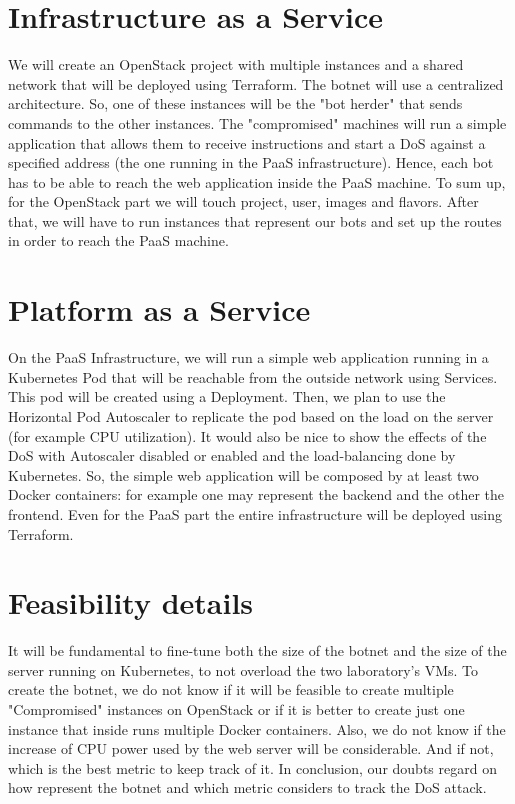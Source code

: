 \documentclass{article}
\begin{document}
\section{Infrastructure as a Service}
\label{iaas}
We will create an OpenStack project with multiple instances and a shared network that will be deployed using Terraform. The botnet will use a centralized architecture. So, one of these instances will be the "bot herder" that sends commands to the other instances. The "compromised" machines will run a simple application that allows them to receive instructions and start a DoS against a specified address (the one running in the PaaS infrastructure). Hence, each bot has to be able to reach the web application inside the PaaS machine. To sum up, for the OpenStack part we will touch project, user, images and flavors. After that, we will have to run instances that represent our bots and set up the routes in order to reach the PaaS machine.

\section{Platform as a Service}
\label{paas}
On the PaaS Infrastructure, we will run a simple web application running in a Kubernetes Pod that will be reachable from the outside network using Services. This pod will be created using a Deployment.  Then, we plan to use the Horizontal Pod Autoscaler to replicate the pod based on the load on the server (for example CPU utilization). It would also be nice to show the effects of the DoS with Autoscaler disabled or enabled and the load-balancing done by Kubernetes. So, the simple web application will be composed by at least two Docker containers: for example one may represent the backend and the other the frontend. Even for the PaaS part the entire infrastructure will be deployed using Terraform.

\section{Feasibility details}
\label{feasibility}
It will be fundamental to fine-tune both the size of the botnet and the size of the server running on Kubernetes, to not overload the two laboratory's VMs. To create the botnet, we do not know if it will be feasible to create multiple "Compromised" instances on OpenStack or if it is better to create just one instance that inside runs multiple Docker containers. Also, we do not know if the increase of CPU power used by the web server will be considerable. And if not, which is the best metric to keep track of it. In conclusion, our doubts regard on how represent the botnet and which metric considers to track the DoS attack.
\end{document}
